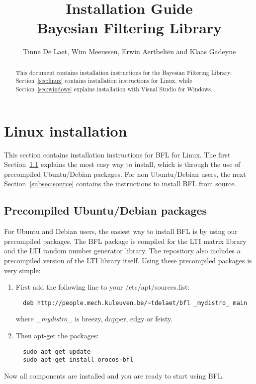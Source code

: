 \documentclass[a4paper,10pt]{article}
\title{Installation Guide \\  Bayesian Filtering Library}
\author{Tinne De Laet, Wim Meeussen, Erwin Aertbeli\"en and Klaas Gadeyne}
\begin{document}
\maketitle

\begin{abstract}
This document contains installation instructions for the Bayesian Filtering Library.
Section~\ref{sec:linux} contains installation instructions for Linux, while Section~\ref{sec:windows} explains installation with Visual Studio for Windows.
\end{abstract}


\section{Linux installation}
\label{sec:linux}
This section contains installation instructions for BFL for Linux.
The first Section~\ref{subsec:ubuntu} explains the most easy way to install, which is through the use of precompiled Ubuntu/Debian packages.
For non Ubuntu/Debian users, the next Section~\ref{subsec:source} contains the instructions to install BFL from source.

\subsection{Precompiled Ubuntu/Debian packages}
\label{subsec:ubuntu}
For Ubuntu and Debian users, the easiest way to install BFL is by
using our precompiled packages.  The BFL package is compiled for the
LTI matrix library and the LTI random number generator library.  The
repository also includes a precompiled version of the LTI library
itself.  Using these precompiled packages is very simple:
\begin{enumerate}
\item First add the following line to your /etc/apt/sources.list:
\begin{verbatim}
  deb http://people.mech.kuleuven.be/~tdelaet/bfl _mydistro_ main
\end{verbatim}
  where \emph{\_mydistro\_} is breezy, dapper, edgy or feisty.
\item Then apt-get the packages:
\begin{verbatim}
  sudo apt-get update
  sudo apt-get install orocos-bfl
\end{verbatim}
\end{enumerate}
Now all components are installed and you are ready to start using BFL.
\end{document}
